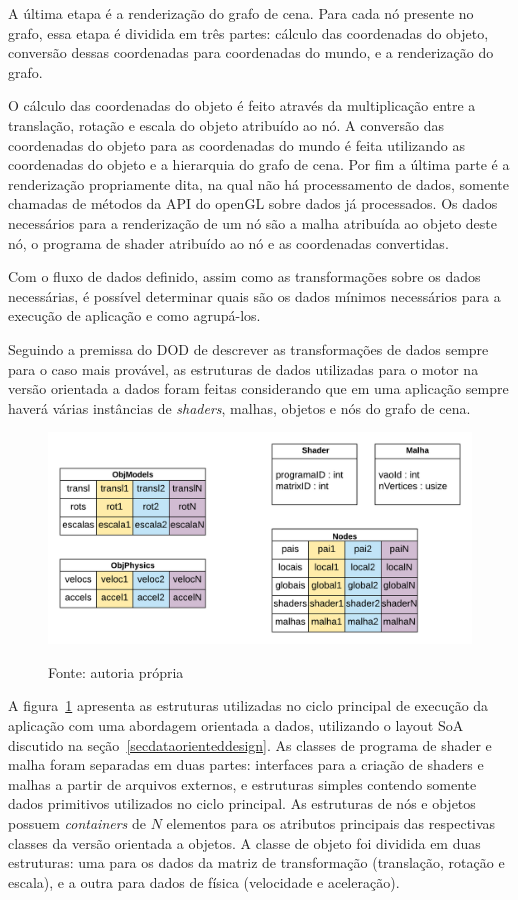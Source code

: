 A última etapa é a renderização do grafo de cena. Para cada nó 
presente no grafo, essa etapa é 
dividida em três partes: cálculo das coordenadas do objeto, 
conversão dessas coordenadas para coordenadas do mundo, e a 
renderização do grafo.

O cálculo das coordenadas do objeto é feito 
através da multiplicação entre a translação, rotação e escala do 
objeto atribuído ao nó. A conversão das 
coordenadas do objeto para as coordenadas do mundo é feita utilizando 
as coordenadas do objeto e a hierarquia do grafo de cena. Por fim 
a última parte é a renderização propriamente dita, na qual não 
há processamento de dados, somente chamadas de métodos da API do 
openGL sobre dados já processados. Os dados necessários para a 
renderização de um nó são a malha atribuída ao objeto deste nó, 
o programa de shader atribuído ao nó e as coordenadas convertidas.

Com o fluxo de dados definido, assim como as transformações sobre 
os dados necessárias, é possível determinar quais são os dados 
mínimos necessários para a execução de aplicação e como 
agrupá-los.

Seguindo a premissa do DOD de descrever as transformações de 
dados sempre para o caso mais provável, as estruturas de dados 
utilizadas para o motor na versão orientada a dados foram 
feitas considerando que em uma aplicação sempre haverá 
várias instâncias de \textit{shaders}, malhas, objetos 
e nós do grafo de cena.

\begin{figure}[h]
    \centering
    \includegraphics[width =.8\textwidth]{../figuras/dodengine}
    \par\medskip
    Fonte: autoria própria
    \label{dodengine}
\end{figure}

A figura~\ref{dodengine} apresenta as estruturas utilizadas no ciclo principal de 
execução da aplicação com uma abordagem orientada a dados, utilizando o layout SoA 
discutido na seção~\ref{secdataorienteddesign}. As classes de programa de 
shader e malha foram separadas em duas partes: interfaces para a criação de shaders 
e malhas a partir de arquivos externos, e estruturas simples contendo somente dados 
primitivos utilizados no ciclo principal. As estruturas de nós e objetos possuem 
\textit{containers} de $N$ elementos para os atributos principais das respectivas 
classes da versão orientada a objetos. A classe de objeto foi dividida em duas 
estruturas: uma para os dados da matriz de transformação (translação, rotação e 
escala), e a outra para dados de física (velocidade e aceleração).

